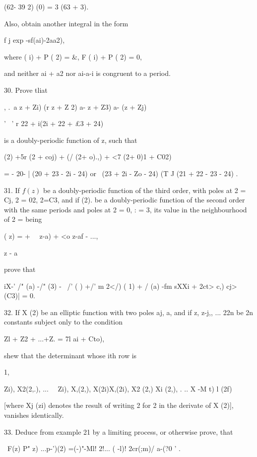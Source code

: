 {(62- 39 2) (0) = 3 (63 + 3).

Also, obtain another integral in the form

 f j exp -sf(ai)-2aa2),

where ( i) + P ( 2) = \&, F ( i) + P ( 2) = 0,

and neither ai + a2 nor ai-a-i is congruent to a period.

%
%

30. Prove tliat

, .\ a z + Zi) (r z + Z 2) a- z + Z3) a- (z + Zj)

  '~ ' r 22 + i(2i + 22 + £3 + 24)

is a doubly-periodic function of z, such that

  (2) +5r (2 + coj) + (/ (2+ o).,) + <7 (2+ 0)1 + C02)

= - 20- | (20 + 23 - 2i - 24) or \ (23 + 2i - Zo - 24) (T J (21 + 22 -
23 - 24) .


31. If $f(z)$ be a doubly-periodic function of the third order, with
poles at 2 = Cj, 2 = 02, 2=C3, and if (2). be a doubly-periodic
function of the second order with the same periods and poles at 2 = 0,
: = 3, its value in the neighbourhood of 2 = being

( z) = + \ \ z-a) + <o z-af - ...,

z - a

prove that

iX-' /" (a) -/" (3) - \ /' ( ) +/' m 2</) ( 1) + / (a) -fm sXXi + 2ct>
c,) cj> (C3)| = 0.


32. If X (2) be an elliptic function with two poles aj, a, and if z,
z-j,, ... 22n be 2n constants subject only to the condition

Zl + Z2 + ...+Z. = 7l ai + Cto),

shew that the determinant whose ith row is

1, \ \ {Zi), X2(2,.), ... \ \ Zi), X,(2,), X(2i)X,(2i), X2 (2,) Xi
(2,), . .. X -M t) l (2f)

[where Xj (zi) denotes the result of writing 2 for 2 in the derivate
of X (2)], vanishes identically. 

33. Deduce from example 21 by a limiting process, or otherwise prove,
that

\ F(z) P" z) ...p-')(2) =(-)"-Ml! 2!... ( -l)! 2cr(;m)/ a-(?0 ' .

}}
